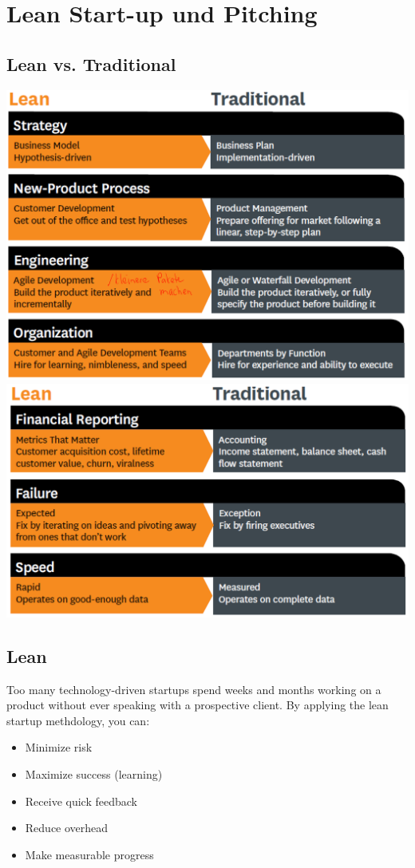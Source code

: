 \section{Lean Start-up und Pitching}
\subsection{Lean vs. Traditional}
\begin{multicols}{2}
	\includegraphics[width=1\linewidth]{images/lean}
	\includegraphics[width=1\linewidth]{images/lean_2}
\end{multicols}

\subsection{Lean}
Too many technology-driven startups spend weeks and months working on a product without ever speaking with a prospective client. By applying the lean startup methdology, you can:
\begin{itemize}
	\item Minimize risk
	\item Maximize success (learning)
	\item Receive quick feedback
	\item Reduce overhead
	\item Make measurable progress
\end{itemize}

